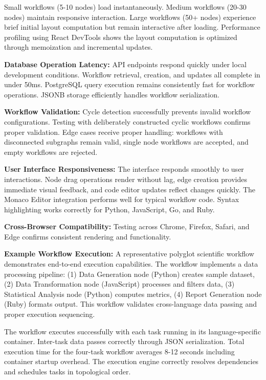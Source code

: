 \documentclass[12pt]{article}
\begin{document}
Small workflows (5-10 nodes) load instantaneously. Medium workflows (20-30 nodes) maintain responsive interaction. Large workflows (50+ nodes) experience brief initial layout computation but remain interactive after loading. Performance profiling using React DevTools shows the layout computation is optimized through memoization and incremental updates.

\textbf{Database Operation Latency:} API endpoints respond quickly under local development conditions. Workflow retrieval, creation, and updates all complete in under 50ms. PostgreSQL query execution remains consistently fast for workflow operations. JSONB storage efficiently handles workflow serialization.

\textbf{Workflow Validation:} Cycle detection successfully prevents invalid workflow configurations. Testing with deliberately constructed cyclic workflows confirms proper validation. Edge cases receive proper handling: workflows with disconnected subgraphs remain valid, single node workflows are accepted, and empty workflows are rejected.

\textbf{User Interface Responsiveness:} The interface responds smoothly to user interactions. Node drag operations render without lag, edge creation provides immediate visual feedback, and code editor updates reflect changes quickly. The Monaco Editor integration performs well for typical workflow code. Syntax highlighting works correctly for Python, JavaScript, Go, and Ruby.

\textbf{Cross-Browser Compatibility:} Testing across Chrome, Firefox, Safari, and Edge confirms consistent rendering and functionality.

\textbf{Example Workflow Execution:} A representative polyglot scientific workflow demonstrates end-to-end execution capabilities. The workflow implements a data processing pipeline: (1) Data Generation node (Python) creates sample dataset, (2) Data Transformation node (JavaScript) processes and filters data, (3) Statistical Analysis node (Python) computes metrics, (4) Report Generation node (Ruby) formats output. This workflow validates cross-language data passing and proper execution sequencing.

The workflow executes successfully with each task running in its language-specific container. Inter-task data passes correctly through JSON serialization. Total execution time for the four-task workflow averages 8-12 seconds including container startup overhead. The execution engine correctly resolves dependencies and schedules tasks in topological order.
\end{document}
